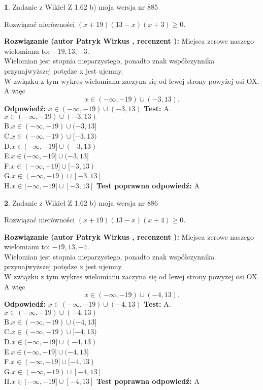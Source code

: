 \documentclass[12pt, a4paper]{article}
\theoremstyle{definition} %
\newtheorem{zad}{}
\newcommand{\zadStart}[1]{\begin{zad}#1\newline}
\newcommand{\zadStop}{\end{zad}}
\newcommand{\rozwStart}[2]{\noindent \textbf{Rozwiązanie (autor #1 , recenzent #2): }\newline}
\newcommand{\rozwStop}{\newline}
\newcommand{\odpStart}{\noindent \textbf{Odpowiedź:}\newline}
\newcommand{\odpStop}{\newline}
\newcommand{\testStart}{\noindent \textbf{Test:}\newline}
\newcommand{\testStop}{\newline}
\newcommand{\kluczStart}{\noindent \textbf{Test poprawna odpowiedź:}\newline}
\newcommand{\kluczStop}{\newline}
\begin{document}
\zadStart{Zadanie z Wikieł Z 1.62 b) moja wersja nr 885}

Rozwiązać nierówności $(x+19)(13-x)(x+3)\ge0$.
\zadStop
\rozwStart{Patryk Wirkus}{}
Miejsca zerowe naszego wielomianu to: $-19, 13, -3$.\\
Wielomian jest stopnia nieparzystego, ponadto znak współczynnika przy\linebreak najwyższej potędze x jest ujemny.\\ W związku z tym wykres wielomianu zaczyna się od lewej strony powyżej osi OX. A więc $$x \in (-\infty,-19) \cup (-3,13).$$
\rozwStop
\odpStart
$x \in (-\infty,-19) \cup (-3,13)$
\odpStop
\testStart
A.$x \in (-\infty,-19) \cup (-3,13)$\\
B.$x \in (-\infty,-19) \cup (-3,13]$\\
C.$x \in (-\infty,-19) \cup [-3,13)$\\
D.$x \in (-\infty,-19] \cup (-3,13)$\\
E.$x \in (-\infty,-19] \cup (-3,13]$\\
F.$x \in (-\infty,-19] \cup [-3,13)$\\
G.$x \in (-\infty,-19) \cup [-3,13]$\\
H.$x \in (-\infty,-19] \cup [-3,13]$
\testStop
\kluczStart
A
\kluczStop



\zadStart{Zadanie z Wikieł Z 1.62 b) moja wersja nr 886}

Rozwiązać nierówności $(x+19)(13-x)(x+4)\ge0$.
\zadStop
\rozwStart{Patryk Wirkus}{}
Miejsca zerowe naszego wielomianu to: $-19, 13, -4$.\\
Wielomian jest stopnia nieparzystego, ponadto znak współczynnika przy\linebreak najwyższej potędze x jest ujemny.\\ W związku z tym wykres wielomianu zaczyna się od lewej strony powyżej osi OX. A więc $$x \in (-\infty,-19) \cup (-4,13).$$
\rozwStop
\odpStart
$x \in (-\infty,-19) \cup (-4,13)$
\odpStop
\testStart
A.$x \in (-\infty,-19) \cup (-4,13)$\\
B.$x \in (-\infty,-19) \cup (-4,13]$\\
C.$x \in (-\infty,-19) \cup [-4,13)$\\
D.$x \in (-\infty,-19] \cup (-4,13)$\\
E.$x \in (-\infty,-19] \cup (-4,13]$\\
F.$x \in (-\infty,-19] \cup [-4,13)$\\
G.$x \in (-\infty,-19) \cup [-4,13]$\\
H.$x \in (-\infty,-19] \cup [-4,13]$
\testStop
\kluczStart
A
\kluczStop
\end{document}
